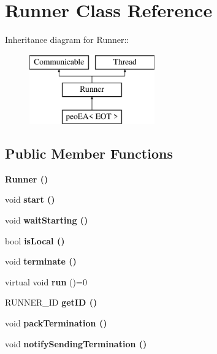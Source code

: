 \section{Runner Class Reference}
\label{class_runner}
Inheritance diagram for Runner::\begin{figure}[H]
\begin{center}
\leavevmode
\includegraphics[height=3cm]{class_runner}
\end{center}
\end{figure}
\subsection*{Public Member Functions}
\begin{CompactItemize}
\item 
\bf{Runner} ()\label{class_runner_7acb8258c21da9daa62f9a177a2e5acd}

\item 
void \bf{start} ()\label{class_runner_7dc4419051fcc5cc9dadd54ecc9cd47d}

\item 
void \bf{wait\-Starting} ()\label{class_runner_5bc239db2be753b77369fa9a038769fd}

\item 
bool \bf{is\-Local} ()\label{class_runner_40adbfb7d6944189b4fff60b02e669ca}

\item 
void \bf{terminate} ()\label{class_runner_0f133e75c28fb8264549814f80608e68}

\item 
virtual void \textbf{run} ()=0\label{class_runner_2d306c1835d8710258d2b52b8cc8312c}

\item 
RUNNER\_\-ID \bf{get\-ID} ()\label{class_runner_5026c74eec184e3a15cb3c0ec4200a57}

\item 
void \bf{pack\-Termination} ()\label{class_runner_2ad6d199d684d6f34347fc202ffe2fa3}

\item 
void \bf{notify\-Sending\-Termination} ()\label{class_runner_3591be473e0fcee1105fb57319b529aa}

\end{CompactItemize}
